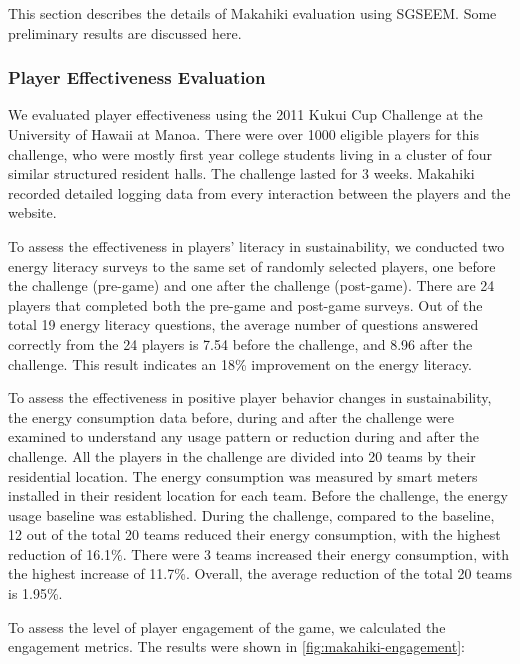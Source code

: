 \documentclass{sigchi}
\begin{document}
This section describes the details of Makahiki evaluation using SGSEEM. Some preliminary results are discussed here.

\subsubsection{Player Effectiveness Evaluation}

We evaluated player effectiveness using the 2011 Kukui Cup Challenge at
the University of Hawaii at Manoa. There were over 1000 eligible players
for this challenge, who were mostly first year college students living
in a cluster of four similar structured resident halls. The challenge lasted for 3 weeks.
Makahiki recorded detailed logging data from every interaction between the
players and the website.

To assess the effectiveness in players' literacy in sustainability, we conducted
two energy literacy surveys to the same set of randomly selected players, one before the challenge (pre-game) and one after the challenge (post-game). There are 24 players that completed both the pre-game and post-game surveys. Out of the total 19 energy literacy questions, the average number of questions answered correctly from the 24 players is 7.54 before the challenge, and 8.96 after the challenge. This result indicates an 18\% improvement on the energy literacy.

To assess the effectiveness in positive player behavior changes in sustainability, the
energy consumption data before, during and after the challenge were
examined to understand any usage pattern or reduction during and after
the challenge. All the players in the challenge are divided into 20 teams by their residential location. The energy consumption was measured by smart meters installed
in their resident location for each team. Before the challenge, the energy usage baseline was established. During the challenge, compared to the baseline, 12 out of the total 20 teams reduced their energy consumption, with the highest reduction of 16.1\%. There were 3 teams increased their energy consumption, with the highest increase of 11.7\%. Overall, the average reduction of the total 20 teams is 1.95\%.

To assess the level of player engagement of the game, we calculated the engagement
metrics. The results were shown in \autoref{fig:makahiki-engagement}:
\end{document}
